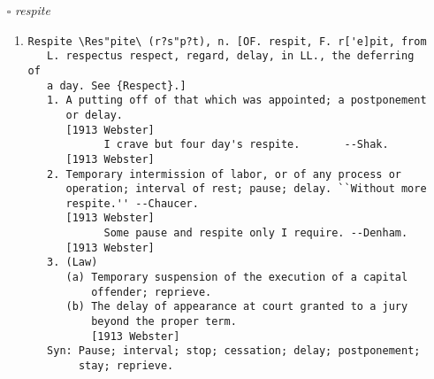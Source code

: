 \documentclass{article}
\begin{document}
\begin{itemize}
\begin{enumerate}
{\begin{lstlisting}
   2. That which falls to one in a division or apportionment
      among a number; a suitable share; proportion; esp., a
      quota of troops.
      [1913 Webster]
            From the Alps to the border of Flanders, contingents
            were required . . . 200,000 men were in arms.
                                                  --Milman.
      [1913 Webster]
Contingent \Con*tin"gent\, a. [L. contingens, -entis, p. pr. of
   contingere to touch on all sides, to happen; con- + tangere
   to touch: cf. F. contingent. See {Tangent}, {Tact}.]
   1. Possible, or liable, but not certain, to occur;
      incidental; casual.
      [1913 Webster]
            Weighing so much actual crime against so much
            contingent advantage.                 --Burke.
      [1913 Webster]
   2. Dependent on that which is undetermined or unknown; as,
      the success of his undertaking is contingent upon events
      which he can not control. ``Uncertain and contingent
      causes.'' --Tillotson.
      [1913 Webster]
   3. (Law) Dependent for effect on something that may or may
      not occur; as, a contingent estate.
      [1913 Webster]
            If a contingent legacy be left to any one when he
            attains, or if he attains, the age of twenty-one.
                                                  --Blackstone.
      [1913 Webster]
\end{lstlisting}}
\end{enumerate}
\item[$\square$] \emph{ respite }
\begin{enumerate}
\item{
\begin{lstlisting}
Respite \Res"pite\ (r?s"p?t), n. [OF. respit, F. r['e]pit, from
   L. respectus respect, regard, delay, in LL., the deferring of
   a day. See {Respect}.]
   1. A putting off of that which was appointed; a postponement
      or delay.
      [1913 Webster]
            I crave but four day's respite.       --Shak.
      [1913 Webster]
   2. Temporary intermission of labor, or of any process or
      operation; interval of rest; pause; delay. ``Without more
      respite.'' --Chaucer.
      [1913 Webster]
            Some pause and respite only I require. --Denham.
      [1913 Webster]
   3. (Law)
      (a) Temporary suspension of the execution of a capital
          offender; reprieve.
      (b) The delay of appearance at court granted to a jury
          beyond the proper term.
          [1913 Webster]
   Syn: Pause; interval; stop; cessation; delay; postponement;
        stay; reprieve.

\end{lstlisting}}
\end{enumerate}
\end{itemize}
\end{document}
